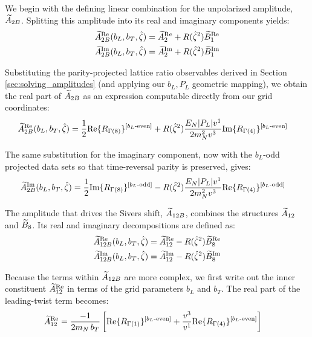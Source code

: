 We begin with the defining linear combination for the unpolarized amplitude, $\widetilde{A}_{2B}$. Splitting this amplitude into its real and imaginary components yields:
\begin{align}
    \widetilde{A}_{2B}^{\text{Re}}(b_L, b_T, \hat{\zeta}) &= \widetilde{A}_2^{\text{Re}} + R({\hat \zeta}^2) \widetilde{B}_1^{\text{Re}} \\
    \widetilde{A}_{2B}^{\text{Im}}(b_L, b_T, \hat{\zeta}) &= \widetilde{A}_2^{\text{Im}} + R({\hat \zeta}^2) \widetilde{B}_1^{\text{Im}}
\end{align}

Substituting the parity-projected lattice ratio observables derived in Section \ref{sec:solving_amplitudes} (and applying our $b_L, P_L$ geometric mapping), we obtain the real part of $\widetilde{A}_{2B}$ as an expression computable directly from our grid coordinates:
\begin{align}
    \widetilde{A}_{2B}^{\text{Re}}(b_L, b_T, \hat{\zeta}) &= \frac{1}{2}\text{Re}\{ R_{\Gamma(8)}\}^{[b_L\text{-even}]} + R({\hat \zeta}^2) \frac{E_{N}|P_L|v^1}{2m_N^2 v^3} \text{Im}\{ R_{\Gamma(4)}\}^{[b_L\text{-even}]}
\end{align}

The same substitution for the imaginary component, now with the $b_L$-odd projected data sets so that time-reversal parity is preserved, gives:
\begin{align}
    \widetilde{A}_{2B}^{\text{Im}}(b_L, b_T, \hat{\zeta}) &= \frac{1}{2}\text{Im}\{ R_{\Gamma(8)}\}^{[b_L\text{-odd}]} - R({\hat \zeta}^2) \frac{E_{N}|P_L|v^1}{2m_N^2 v^3} \text{Re}\{ R_{\Gamma(4)}\}^{[b_L\text{-odd}]}
\end{align}

The amplitude that drives the Sivers shift, $\widetilde{A}_{12B}$, combines the structures $\widetilde{A}_{12}$ and $\widetilde{B}_8$. Its real and imaginary decompositions are defined as:
\begin{align}
    \widetilde{A}_{12B}^{\text{Re}}(b_L, b_T, \hat{\zeta}) &= \widetilde{A}_{12}^{\text{Re}} - R({\hat \zeta}^2) \widetilde{B}_8^{\text{Re}} \\
    \widetilde{A}_{12B}^{\text{Im}}(b_L, b_T, \hat{\zeta}) &= \widetilde{A}_{12}^{\text{Im}} - R({\hat \zeta}^2) \widetilde{B}_8^{\text{Im}}
\end{align}

Because the terms within $\widetilde{A}_{12B}$ are more complex, we first write out the inner constituent $\widetilde{A}_{12}^{\text{Re}}$ in terms of the grid parameters $b_L$ and $b_T$. The real part of the leading-twist term becomes:
\begin{align}
    \widetilde{A}^{\text{Re}}_{12} &= \frac{-1}{2m_N\, b_T} \left[\text{Re}\{ R_{\Gamma(1)}\}^{[b_L\text{-even}]} + \frac{v^3}{v^1}\text{Re}\{ R_{\Gamma(4)}\}^{[b_L\text{-even}]}\right]
\end{align}

